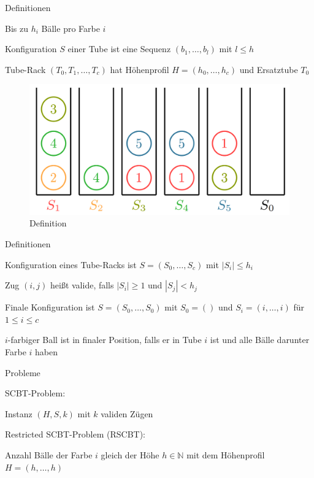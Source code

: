 \documentclass{beamer}
\begin{document}
		\begin{frame}{Definitionen}
	\begin{pointlist}
		\item Bis zu $h_i$ Bälle pro Farbe $i$
		\item Konfiguration $S$ einer Tube ist eine Sequenz $(b_1,\dots,b_l)$ mit $l\leq h$
		\item Tube-Rack $(T_0, T_1,\dots,T_c)$ hat Höhenprofil $H=(h_0,\dots,h_c)$ und Ersatztube $T_0$
		\end{pointlist}
		
\begin{figure}[ht]
		\includegraphics[width=.65\textwidth]{def}
		\caption{Definition}
    \end{figure}
		\end{frame}
		
		
\begin{frame}{Definitionen}
	\begin{pointlist}
		\item Konfiguration eines Tube-Racks ist $S=(S_0,\dots,S_c)$ mit $|S_i| \leq h_i$
		\item Zug $(i,j)$ heißt valide, falls $|S_i|\geq 1$ und $|S_j| < h_j$
		\item Finale Konfiguration ist $S=(S_0,\dots, S_0)$ mit $S_0 = ()$ und $S_i =(i,\dots,i)$ für $1\leq i \leq c$
		\item $i$-farbiger Ball ist in finaler Position, falls er in Tube $i$ ist und alle Bälle darunter Farbe $i$ haben
	\end{pointlist}
\end{frame}

\begin{frame}{Probleme}
	\begin{pointlist}
		\item SCBT-Problem:
		\begin{arrowlist}
 			\item Instanz $(H,S,k)$ mit $k$ validen Zügen
		\end{arrowlist}
		\item Restricted SCBT-Problem (RSCBT):
		\begin{arrowlist}
 			\item Anzahl Bälle der Farbe $i$ gleich der Höhe $h\in\mathbb{N}$ mit dem Höhenprofil $H=(h,\dots,h)$
		\end{arrowlist}
	\end{pointlist}
\end{frame}
\end{document}
